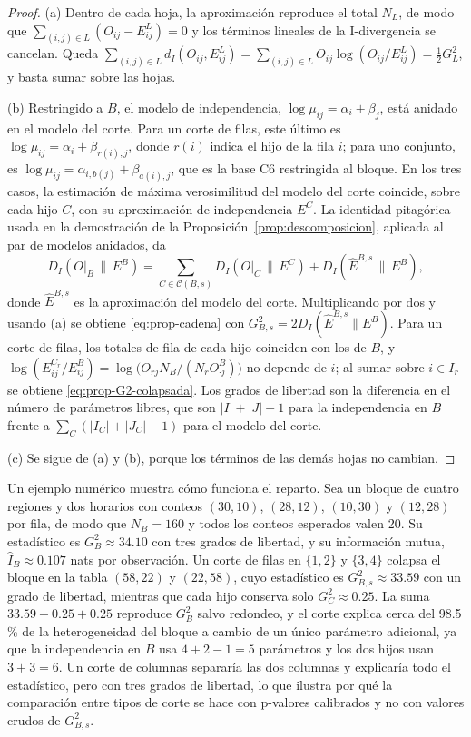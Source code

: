 \begin{proof}
(a) Dentro de cada hoja, la aproximación reproduce el total $N_L$, de modo que
$\sum_{(i,j)\in L}(O_{ij}-E^{L}_{ij}) = 0$ y los términos lineales de la
I-divergencia se cancelan. Queda
$\sum_{(i,j)\in L} d_I(O_{ij},E^L_{ij}) = \sum_{(i,j)\in L} O_{ij}\log(O_{ij}/E^L_{ij}) = \tfrac12 G^2_L$,
y basta sumar sobre las hojas.

(b) Restringido a $B$, el modelo de independencia,
$\log\mu_{ij} = \alpha_i + \beta_j$, está anidado en el modelo del corte. Para
un corte de filas, este último es $\log\mu_{ij} = \alpha_i + \beta_{r(i),j}$,
donde $r(i)$ indica el hijo de la fila $i$; para uno conjunto, es
$\log\mu_{ij} = \alpha_{i,b(j)} + \beta_{a(i),j}$, que es la base C6 restringida
al bloque. En los tres casos, la estimación de máxima verosimilitud del modelo
del corte coincide, sobre cada hijo $C$, con su aproximación de independencia
$E^{C}$. La identidad pitagórica usada en la demostración de la
Proposición~\ref{prop:descomposicion}, aplicada al par de modelos anidados,
da
\[
  D_I(O|_B \,\|\, E^{B})
  = \sum_{C\in\mathcal{C}(B,s)} D_I(O|_C \,\|\, E^{C})
  + D_I(\hat E^{B,s} \,\|\, E^{B}),
\]
donde $\hat E^{B,s}$ es la aproximación del modelo del corte. Multiplicando por
dos y usando (a) se obtiene \eqref{eq:prop-cadena} con
$G^2_{B,s} = 2D_I(\hat E^{B,s}\|E^B)$. Para un corte de filas, los totales de
fila de cada hijo coinciden con los de $B$, y
$\log(E^{C_r}_{ij}/E^{B}_{ij}) = \log\bigl(O_{rj}N_B/(N_r O^B_{\cdot j})\bigr)$
no depende de $i$; al sumar sobre $i\in I_r$ se obtiene
\eqref{eq:prop-G2-colapsada}. Los grados de libertad son la diferencia en el
número de parámetros libres, que son $|I|+|J|-1$ para la independencia en $B$ frente a
$\sum_C(|I_C|+|J_C|-1)$ para el modelo del corte.

(c) Se sigue de (a) y (b), porque los términos de las demás hojas no cambian.
\end{proof}

Un ejemplo numérico muestra cómo funciona el reparto. Sea un bloque de cuatro
regiones y dos horarios con conteos $(30,10)$, $(28,12)$, $(10,30)$ y $(12,28)$
por fila, de modo que $N_B = 160$ y todos los conteos esperados valen 20. Su
estadístico es $G^2_B\approx 34.10$ con tres grados de libertad, y su
información mutua, $\hat I_B\approx 0.107$ nats por observación. Un corte de
filas en $\{1,2\}$ y $\{3,4\}$ colapsa el bloque en la tabla $(58,22)$ y
$(22,58)$, cuyo estadístico es $G^2_{B,s}\approx 33.59$ con un grado de libertad,
mientras que cada hijo conserva solo $G^2_C\approx 0.25$. La suma
$33.59 + 0.25 + 0.25$ reproduce $G^2_B$ salvo redondeo, y el corte explica cerca
del 98.5\,\% de la heterogeneidad del bloque a cambio de un único parámetro
adicional, ya que la independencia en $B$ usa $4+2-1=5$ parámetros y los dos
hijos usan $3+3=6$. Un corte de columnas separaría las dos columnas y explicaría
todo el estadístico, pero con tres grados de libertad, lo que ilustra por qué
la comparación entre tipos de corte se hace con p-valores calibrados y no con
valores crudos de $G^2_{B,s}$.

